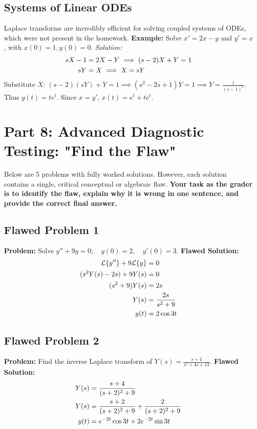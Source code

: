 \documentclass[11pt, letterpaper]{article}
\theoremstyle{definition}
\theoremstyle{remark}
\newcommand{\Lap}{\mathcal{L}}
\begin{document}
\subsection{Systems of Linear ODEs}
Laplace transforms are incredibly efficient for solving coupled systems of ODEs, which were not present in the homework.
\textbf{Example:} Solve $x' = 2x - y$ and $y' = x$, with $x(0)=1, y(0)=0$.
\textit{Solution:}
\begin{align*}
sX - 1 &= 2X - Y \implies (s-2)X + Y = 1 \\ \relax
sY &= X \implies X = sY
\end{align*}
Substitute $X$: $(s-2)(sY) + Y = 1 \implies (s^2 - 2s + 1)Y = 1 \implies Y = \frac{1}{(s-1)^2}$.
Thus $y(t) = te^t$. Since $x = y'$, $x(t) = e^t + te^t$.

\newpage
\section{Part 8: Advanced Diagnostic Testing: "Find the Flaw"}

Below are 5 problems with fully worked solutions. However, each solution contains a single, critical conceptual or algebraic flaw. \textbf{Your task as the grader is to identify the flaw, explain why it is wrong in one sentence, and provide the correct final answer.}

\subsection*{Flawed Problem 1}
\textbf{Problem:} Solve $y'' + 9y = 0 ; \quad y(0) = 2 , \quad y'(0) = 3$.
\textbf{Flawed Solution:}
\begin{align*}
\Lap\{y''\} + 9\Lap\{y\} &= 0 \\ \relax
(s^2 Y(s) - 2s) + 9Y(s) &= 0 \\ \relax
(s^2 + 9)Y(s) &= 2s \\ \relax
Y(s) &= \frac{2s}{s^2 + 9} \\ \relax
y(t) &= 2\cos 3t
\end{align*}

\subsection*{Flawed Problem 2}
\textbf{Problem:} Find the inverse Laplace transform of $Y(s) = \frac{s + 4}{s^2 + 4s + 13}$.
\textbf{Flawed Solution:}
\begin{align*}
Y(s) &= \frac{s + 4}{(s + 2)^2 + 9} \\ \relax
Y(s) &= \frac{s + 2}{(s + 2)^2 + 9} + \frac{2}{(s + 2)^2 + 9} \\ \relax
y(t) &= e^{-2t}\cos 3t + 2e^{-2t}\sin 3t
\end{align*}
\end{document}

